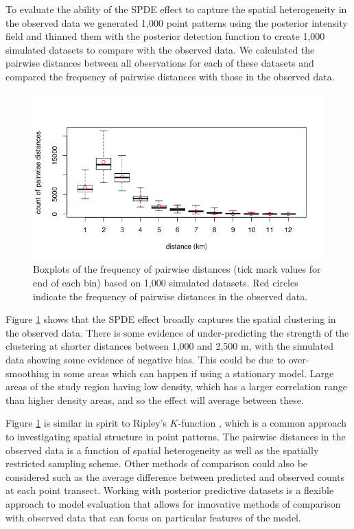 \documentclass{statsoc}
\begin{document}
To evaluate the ability of the SPDE effect to capture the spatial heterogeneity in the observed data we generated 1,000 point patterns using the posterior intensity field and thinned them with the posterior detection function to create 1,000 simulated datasets to compare with the observed data.  We calculated the pairwise distances between all observations for each of these datasets and compared the frequency of pairwise distances with those in the observed data.
\begin{figure}[!htb]
	\begin{center}
		\includegraphics[scale=0.6]{figures/post_pp_distances.png}
		\caption{Boxplots of the frequency of pairwise distances (tick mark values for end of each bin) based on 1,000 simulated datasets.  Red circles indicate the frequency of pairwise distances in the observed data.}
		\label{fig:post-pp-distances}
	\end{center}
\end{figure}
Figure \ref{fig:post-pp-distances} shows that the SPDE effect broadly captures the spatial clustering in the observed data.  There is some evidence of under-predicting the strength of the clustering at shorter distances between 1,000 and 2,500 m, with the simulated data showing some evidence of negative bias.  This could be due to over-smoothing in some areas which can happen if using a stationary model.  Large areas of the study region having low density, which has a larger correlation range than higher density areas, and so the effect will average between these. 

Figure \ref{fig:post-pp-distances} is similar in spirit to Ripley's $K$-function \citep{ripley_SecondorderAnalysisStationary_1976}, which is a common approach to investigating spatial structure in point patterns.  The pairwise distances in the observed data is a function of spatial heterogeneity as well as the spatially restricted sampling scheme.  Other methods of comparison could also be considered such as the average difference between predicted and observed counts at each point transect.  Working with posterior predictive datasets is a flexible approach to model evaluation that allows for innovative methods of comparison with observed data that can focus on particular features of the model.
\end{document}
